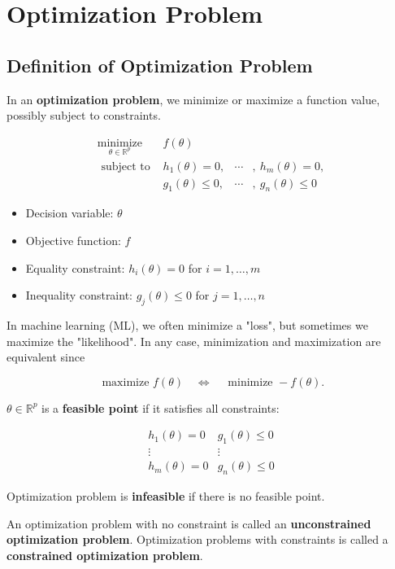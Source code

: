 \chapter{Optimization Problem}

\section{Definition of Optimization Problem}

\begin{definition}
    In an \textbf{optimization problem}, we minimize or maximize a function value, possibly subject to constraints.

    $$
    \begin{array}{ll}
    \underset{\theta \in \mathbb{R}^{p}}{\operatorname{minimize}} & f(\theta) \\
    \text { subject to } & h_{1}(\theta)=0, & \cdots & , \ h_{m}(\theta)=0, \\
    & g_{1}(\theta) \le 0, & \cdots & , \ g_{n}(\theta) \le 0
    \end{array}
    $$

    \begin{itemize}
        \item Decision variable: $\theta$
        \item Objective function: $f$
        \item Equality constraint: $h_{i}(\theta)=0$ for $i=1, \ldots, m$
        \item Inequality constraint: $g_{j}(\theta) \leq 0$ for $j=1, \ldots, n$
    \end{itemize}
\end{definition}

In machine learning (ML), we often minimize a "loss", but sometimes we maximize the "likelihood".
In any case, minimization and maximization are equivalent since

$$
\text { maximize } f(\theta) \quad \Leftrightarrow \quad \text { minimize }-f(\theta).
$$

\begin{definition}
    $\theta \in \mathbb{R}^{p}$ is a \textbf{feasible point} if it satisfies all constraints:

    $$
    \begin{array}{cc}
    h_{1}(\theta)=0 & g_{1}(\theta) \leq 0 \\
    \vdots & \vdots \\
    h_{m}(\theta)=0 & g_{n}(\theta) \leq 0
    \end{array}
    $$

    Optimization problem is \textbf{infeasible} if there is no feasible point.

    An optimization problem with no constraint is called an \textbf{unconstrained optimization problem}. Optimization problems with constraints is called a \textbf{constrained optimization problem}.
\end{definition}

